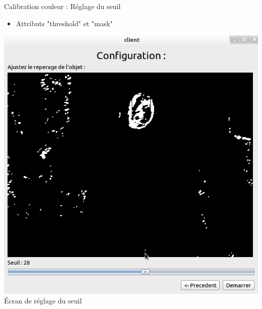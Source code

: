 \documentclass{beamer}
\begin{document}
            \begin{frame}{Calibration couleur : Réglage du seuil}
                  \begin{itemize}
                        \item{Attributs "threshold" et "mask"}
                  \end{itemize}
                  \begin{center}
                        \includegraphics[scale=0.25]{Capture2.png}\\
                        Écran de réglage du seuil
                  \end{center}
            \end{frame}
\end{document}
